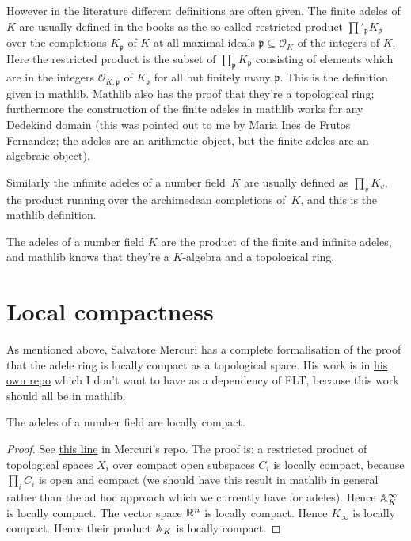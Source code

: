 However in the literature different definitions
are often given. The finite adeles of $K$ are usually defined in the books
as the so-called restricted product $\prod'_{\mathfrak{p}}K_{\mathfrak{p}}$ over the completions
$K_{\mathfrak{p}}$ of $K$ at all maximal ideals $\mathfrak{p}\subseteq\mathcal{O}_K$ of the
integers of $K$. Here the restricted product is the subset of $\prod_{\mathfrak{p}}K_{\mathfrak{p}}$
consisting of elements which are in the integers $\mathcal{O}_{K,\mathfrak{p}}$ of
$K_{\mathfrak{p}}$ for all but finitely many $\mathfrak{p}$. This is the definition given in
mathlib. Mathlib also has the proof that they're a topological ring;
furthermore the construction of the finite adeles in mathlib works for any
Dedekind domain (this was pointed out to me by Maria Ines de Frutos Fernandez; the adeles
are an arithmetic object, but the finite adeles are an algebraic object).

Similarly the infinite adeles of a number field~$K$
are usually defined as $\prod_v K_v$,
the product running over the archimedean completions of~$K$, and this is
the mathlib definition.

The adeles of a number field $K$ are the product of the finite and infinite
adeles, and mathlib knows that they're a $K$-algebra and a topological ring.

\section{Local compactness}

As mentioned above, Salvatore Mercuri has a complete formalisation of the proof
that the adele ring is locally compact as a topological space. His work is in
\href{https://github.com/smmercuri/adele-ring_locally-compact}{his own repo} which
I don't want to have as a dependency of FLT, because this work should all be
in mathlib.

\begin{theorem}
  \label{NumberField.AdeleRing.locallyCompactSpace}
  \leanok
  The adeles of a number field are locally compact.
\end{theorem}
\begin{proof}
  See \href{https://github.com/smmercuri/adele-ring_locally-compact/blob/e8e34608c139ee95a1e21d9d24f138524196a2e1/AdeleRingLocallyCompact/NumberTheory/NumberField/AdeleRing.lean#L70}
  {this line} in Mercuri's repo. The proof is: a restricted product of topological spaces $X_i$
  over compact open subspaces $C_i$ is locally compact, because $\prod_i C_i$ is open and compact
  (we should have this result in mathlib in general rather than the ad hoc approach which we
  currently have for adeles).
  Hence $\mathbb{A}_K^\infty$ is locally compact.
  The vector space $\mathbb{R}^n$ is locally compact. Hence $K_{\infty}$ is locally compact.
  Hence their product $\mathbb{A}_K$ is locally compact.
\end{proof}

